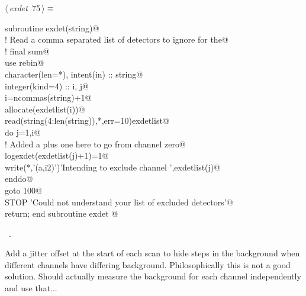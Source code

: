 \documentclass[10pt,a4paper,notitlepage]{article}
\begin{document}
\begin{flushleft} \small
\begin{minipage}{\linewidth}\label{scrap84}\raggedright\small
{} $\langle\,${\it exdet}\nobreak\ {\footnotesize {75}}$\,\rangle\equiv$
\vspace{-1ex}
\begin{list}{}{} \item
\mbox{}\verb@      subroutine exdet(string)@\\
\mbox{}\verb@! Read a comma separated list of detectors to ignore for the@\\
\mbox{}\verb@! final sum@\\
\mbox{}\verb@      use rebin@\\
\mbox{}\verb@      character(len=*), intent(in) :: string@\\
\mbox{}\verb@      integer(kind=4) :: i, j@\\
\mbox{}\verb@      i=ncommas(string)+1@\\
\mbox{}\verb@      allocate(exdetlist(i))@\\
\mbox{}\verb@      read(string(4:len(string)),*,err=10)exdetlist@\\
\mbox{}\verb@      do j=1,i@\\
\mbox{}\verb@! Added a plus one here to go from channel zero@\\
\mbox{}\verb@       logexdet(exdetlist(j)+1)=1@\\
\mbox{}\verb@       write(*,'(a,i2)')'Intending to exclude channel ',exdetlist(j)@\\
\mbox{}\verb@      enddo@\\
\mbox{}\verb@      goto 100@\\
\mbox{}    STOP 'Could not understand your list of excluded detectors'@\\
\mbox{}   return; end subroutine exdet                                        @{\NWsep}
\end{list}
\vspace{-1.5ex}
\footnotesize
\begin{list}{}{\setlength{\itemsep}{-\parsep}\setlength{\itemindent}{-\leftmargin}}
\item \NWtxtMacroRefIn\ .

\item{}
\end{list}
\end{minipage}\vspace{4ex}
\end{flushleft}
Add a jitter offset at the start of each scan to hide steps in the background
when different channels have differing background. Philosophically this is
not a good solution. Should actually measure the background for each channel
independently and use that...
\end{document}
